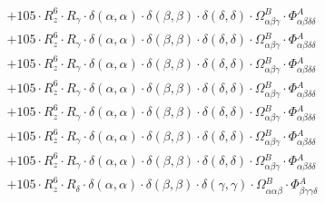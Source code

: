 \documentclass{article}
\begin{document}
\begin{subequations}
\begin{gather}
\begin{array}{c}
 \\[0.2em] 		 + 105 \cdot R_{z}^{6} \cdot R_{\gamma{}} \cdot \delta{}\left(\alpha{}, \alpha{}\right) \cdot \delta{}\left(\beta{}, \beta{}\right) \cdot \delta{}\left(\delta{}, \delta{}\right) \cdot \Omega{}^{B}_{\alpha{}\beta{}\gamma{}} \cdot \Phi{}^{A}_{\alpha{}\beta{}\delta{}\delta{}} 
 \\[0.2em] 		 + 105 \cdot R_{z}^{6} \cdot R_{\gamma{}} \cdot \delta{}\left(\alpha{}, \alpha{}\right) \cdot \delta{}\left(\beta{}, \beta{}\right) \cdot \delta{}\left(\delta{}, \delta{}\right) \cdot \Omega{}^{B}_{\alpha{}\beta{}\gamma{}} \cdot \Phi{}^{A}_{\alpha{}\beta{}\delta{}\delta{}} 
 \\[0.2em] 		 + 105 \cdot R_{z}^{6} \cdot R_{\gamma{}} \cdot \delta{}\left(\alpha{}, \alpha{}\right) \cdot \delta{}\left(\beta{}, \beta{}\right) \cdot \delta{}\left(\delta{}, \delta{}\right) \cdot \Omega{}^{B}_{\alpha{}\beta{}\gamma{}} \cdot \Phi{}^{A}_{\alpha{}\beta{}\delta{}\delta{}} 
 \\[0.2em] 		 + 105 \cdot R_{z}^{6} \cdot R_{\gamma{}} \cdot \delta{}\left(\alpha{}, \alpha{}\right) \cdot \delta{}\left(\beta{}, \beta{}\right) \cdot \delta{}\left(\delta{}, \delta{}\right) \cdot \Omega{}^{B}_{\alpha{}\beta{}\gamma{}} \cdot \Phi{}^{A}_{\alpha{}\beta{}\delta{}\delta{}} 
 \\[0.2em] 		 + 105 \cdot R_{z}^{6} \cdot R_{\gamma{}} \cdot \delta{}\left(\alpha{}, \alpha{}\right) \cdot \delta{}\left(\beta{}, \beta{}\right) \cdot \delta{}\left(\delta{}, \delta{}\right) \cdot \Omega{}^{B}_{\alpha{}\beta{}\gamma{}} \cdot \Phi{}^{A}_{\alpha{}\beta{}\delta{}\delta{}} 
 \\[0.2em] 		 + 105 \cdot R_{z}^{6} \cdot R_{\gamma{}} \cdot \delta{}\left(\alpha{}, \alpha{}\right) \cdot \delta{}\left(\beta{}, \beta{}\right) \cdot \delta{}\left(\delta{}, \delta{}\right) \cdot \Omega{}^{B}_{\alpha{}\beta{}\gamma{}} \cdot \Phi{}^{A}_{\alpha{}\beta{}\delta{}\delta{}} 
 \\[0.2em] 		 + 105 \cdot R_{z}^{6} \cdot R_{\gamma{}} \cdot \delta{}\left(\alpha{}, \alpha{}\right) \cdot \delta{}\left(\beta{}, \beta{}\right) \cdot \delta{}\left(\delta{}, \delta{}\right) \cdot \Omega{}^{B}_{\alpha{}\beta{}\gamma{}} \cdot \Phi{}^{A}_{\alpha{}\beta{}\delta{}\delta{}} 
 \\[0.2em] 		 + 105 \cdot R_{z}^{6} \cdot R_{\delta{}} \cdot \delta{}\left(\alpha{}, \alpha{}\right) \cdot \delta{}\left(\beta{}, \beta{}\right) \cdot \delta{}\left(\gamma{}, \gamma{}\right) \cdot \Omega{}^{B}_{\alpha{}\alpha{}\beta{}} \cdot \Phi{}^{A}_{\beta{}\gamma{}\gamma{}\delta{}} 

\end{array}
\end{gather}
\end{subequations}
\end{document}
